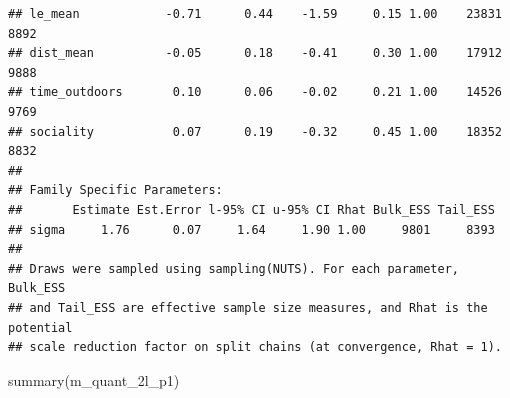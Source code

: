 \documentclass[
]{article}
\newenvironment{Shaded}{\begin{snugshade}}{\end{snugshade}}
\newcommand{\FunctionTok}[1]{\textcolor[rgb]{0.00,0.00,0.00}{#1}}
\newcommand{\NormalTok}[1]{#1}
\begin{document}
\begin{verbatim}
## le_mean            -0.71      0.44    -1.59     0.15 1.00    23831     8892
## dist_mean          -0.05      0.18    -0.41     0.30 1.00    17912     9888
## time_outdoors       0.10      0.06    -0.02     0.21 1.00    14526     9769
## sociality           0.07      0.19    -0.32     0.45 1.00    18352     8832
## 
## Family Specific Parameters: 
##       Estimate Est.Error l-95% CI u-95% CI Rhat Bulk_ESS Tail_ESS
## sigma     1.76      0.07     1.64     1.90 1.00     9801     8393
## 
## Draws were sampled using sampling(NUTS). For each parameter, Bulk_ESS
## and Tail_ESS are effective sample size measures, and Rhat is the potential
## scale reduction factor on split chains (at convergence, Rhat = 1).
\end{verbatim}

\begin{Shaded}
\begin{Highlighting}[]
\FunctionTok{summary}\NormalTok{(m\_quant\_2l\_p1)}
\end{Highlighting}
\end{Shaded}
\end{document}
